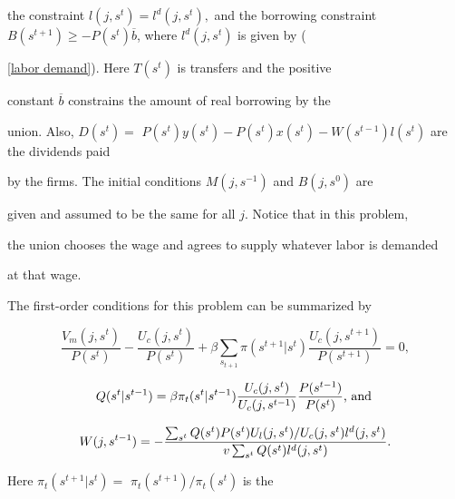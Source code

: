 \documentclass[fleqn,leqno,11pt]{article}
\begin{document}
the constraint $l(j,s^{t})=l^{d}(j,s^{t}),$ and the borrowing constraint $%

B(s^{t+1})\geq -P(s^{t})\overline{b}$, where $l^{d}(j,s^{t})$ is given by (%

\ref{labor demand})$.$ Here $T(s^{t})$ is transfers and the positive

constant $\overline{b}$ constrains the amount of real borrowing by the

union. Also, $D(s^{t})=$ $%

P(s^{t})y(s^{t})-P(s^{t})x(s^{t})-W(s^{t-1})l(s^{t})$ are the dividends paid

by the firms$.$ The initial conditions $M(j,s^{-1})$ and $B(j,s^{0})$ are

given and assumed to be the same for all $j.$ Notice that in this problem,

the union chooses the wage and agrees to supply whatever labor is demanded

at that wage.



The first-order conditions for this problem can be summarized by 

\begin{equation}

\frac{V_{m}(j,s^{t})}{P(s^{t})}-\frac{U_{c}(j,s^{t})}{P(s^{t})}+\beta

\sum_{s_{t+1}}\pi (s^{t+1}|s^{t})\frac{U_{c}(j,s^{t+1})}{P(s^{t+1})}=0,

\label{money foc}

\end{equation}%

\begin{equation}

Q(s^{t}|s^{t-1})=\beta \pi _{t}(s^{t}|s^{t-1})\frac{U_{c}(j,s^{t})}{%

U_{c}(j,s^{t-1})}\frac{P(s^{t-1})}{P(s^{t})}\text{, and }  \label{Q}

\end{equation}%

\begin{equation}

W(j,s^{t-1})=-\frac{%

\sum_{s^{t}}Q(s^{t})P(s^{t})U_{l}(j,s^{t})/U_{c}(j,s^{t})l^{d}(j,s^{t})}{%

v\sum_{s^{t}}Q(s^{t})l^{d}(j,s^{t})}.  \label{wage setting 1}

\end{equation}%

Here $\pi _{t}(s^{t+1}|s^{t})=$ $\pi _{t}(s^{t+1})/\pi _{t}(s^{t})$ is the
\end{document}

